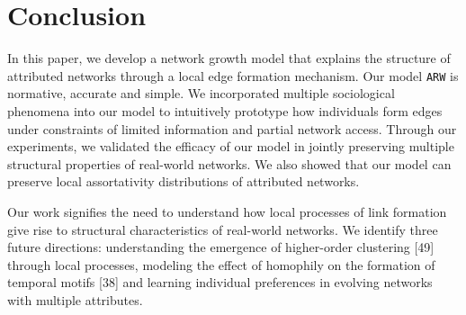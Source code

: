 
\section{Conclusion}
\label{sec:Conclusion}
In this paper, we develop a network growth model that explains the
structure of attributed networks through a local edge formation mechanism. Our
model \texttt{ARW} is normative, accurate and simple. We incorporated multiple
sociological phenomena into our model to intuitively prototype how individuals
form edges under constraints of limited information and partial network access.
Through our experiments, we validated the efficacy of our model in jointly preserving
multiple structural properties of real-world networks. We also showed that our
model can preserve local assortativity distributions of attributed networks.

Our work signifies the need to understand how local processes of link formation
give rise to structural characteristics of real-world networks.
We identify three future directions: understanding the emergence of higher-order clustering [49]
through local processes, modeling the effect of homophily on the formation of temporal motifs [38]
and learning individual preferences in evolving networks with multiple attributes.


